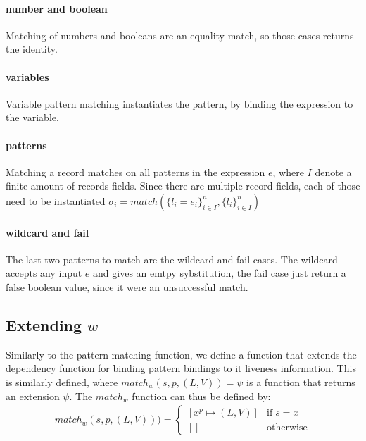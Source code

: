 \documentclass[../../master.tex]{subfiles}
\begin{document}
\paragraph{number and boolean}
Matching of numbers and booleans are an equality match, so those cases returns the identity.

\paragraph{variables}
Variable pattern matching instantiates the pattern, by binding the expression to the variable.

\paragraph{patterns}
Matching a record matches on all patterns in the expression $e$, where $I$ denote a finite amount of records fields.
Since there are multiple record fields, each of those need to be instantiated
$\sigma_i=match(\{l_i=e_i\}^n_{i \in I},\{l_i\}^n_{i \in I})$

\paragraph{wildcard and fail}
The last two patterns to match are the wildcard and fail cases.
The wildcard accepts any input $e$ and gives an emtpy sybstitution, the fail case just return a false boolean value, since it were an unsuccessful match.


\subsection{Extending $w$}
Similarly to the pattern matching function, we define a function that extends the dependency function for binding pattern bindings to it liveness information.
This is similarly defined, where $match_w(s,p,(L,V))=\psi$ is a function that returns an extension $\psi$.
The $match_w$ function can thus be defined by:
\begin{align}
	match_w(s,p,(L,V))) =
	\left\{\begin{matrix}
		[x^p\mapsto (L,V)] & \mbox{if}\; s=x\\ 
		[] & \mbox{otherwise}
	\end{matrix}\right.
\end{align}
\end{document}
